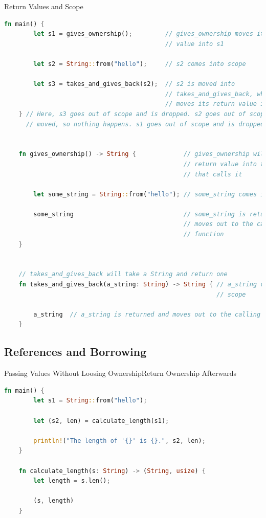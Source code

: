 \begin{Frame}{Return Values and Scope}
  \begin{lstlisting}[language=Rust,gobble=4]
    fn main() {
        let s1 = gives_ownership();         // gives_ownership moves its return
                                            // value into s1

        let s2 = String::from("hello");     // s2 comes into scope

        let s3 = takes_and_gives_back(s2);  // s2 is moved into
                                            // takes_and_gives_back, which also
                                            // moves its return value into s3
    } // Here, s3 goes out of scope and is dropped. s2 goes out of scope but was
      // moved, so nothing happens. s1 goes out of scope and is dropped.


    fn gives_ownership() -> String {             // gives_ownership will move its
                                                 // return value into the function
                                                 // that calls it

        let some_string = String::from("hello"); // some_string comes into scope

        some_string                              // some_string is returned and
                                                 // moves out to the calling
                                                 // function
    }


    // takes_and_gives_back will take a String and return one
    fn takes_and_gives_back(a_string: String) -> String { // a_string comes into
                                                          // scope

        a_string  // a_string is returned and moves out to the calling function
    }
  \end{lstlisting}
\end{Frame}

\subsection{References and Borrowing}

\begin{Frame}[fragile,t]{Passing Values Without Loosing Ownership}{Return Ownership Afterwards}
  \begin{lstlisting}[language=Rust,gobble=4]
    fn main() {
        let s1 = String::from("hello");

        let (s2, len) = calculate_length(s1);

        println!("The length of '{}' is {}.", s2, len);
    }

    fn calculate_length(s: String) -> (String, usize) {
        let length = s.len();

        (s, length)
    }
  \end{lstlisting}
\end{Frame}


